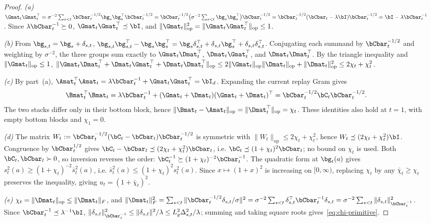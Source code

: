 \begin{proof}
\emph{(a)}
$\Gmat_t\Gmat_t^\top
=\sigma^{-2}\sum_{s<t}\bCbar_t^{-1/2}\bg_s\bg_s^\top\bCbar_t^{-1/2}
=\bCbar_t^{-1/2}\bigl(\sigma^{-2}\sum_{s<t}\bg_s\bg_s^\top\bigr)\bCbar_t^{-1/2}
=\bCbar_t^{-1/2}(\bCbar_t-\lambda\bI)\bCbar_t^{-1/2}
=\bI-\lambda\bCbar_t^{-1}$.
Since $\lambda\bCbar_t^{-1}\succeq0$, $\Gmat_t\Gmat_t^\top\preceq\bI$, and
$\|\Gmat_t\|_{\mathrm{op}}^2=\|\Gmat_t\Gmat_t^\top\|_{\mathrm{op}}\le1$.

\emph{(b)}
From $\bg_{s,t}=\bg_s+\delta_{s,t}$,
$\bg_{s,t}\bg_{s,t}^\top-\bg_s\bg_s^\top
=\bg_s\delta_{s,t}^\top+\delta_{s,t}\bg_s^\top+\delta_{s,t}\delta_{s,t}^\top$.
Conjugating each summand by $\bCbar_t^{-1/2}$ and weighting by
$\sigma^{-2}$, the three groups sum exactly to
$\Gmat_t\Dmat_t^\top$, $\Dmat_t\Gmat_t^\top$, and $\Dmat_t\Dmat_t^\top$.
By the triangle inequality and $\|\Gmat_t\|_{\mathrm{op}}\le1$,
$\|\Gmat_t\Dmat_t^\top+\Dmat_t\Gmat_t^\top+\Dmat_t\Dmat_t^\top\|_{\mathrm{op}}
\le 2\|\Gmat_t\|_{\mathrm{op}}\|\Dmat_t\|_{\mathrm{op}}+\|\Dmat_t\|_{\mathrm{op}}^2
\le 2\chi_t+\chi_t^2$.

\emph{(c)}
By part~(a),
$\Amat_t^\top\Amat_t=\lambda\bCbar_t^{-1}
+\Gmat_t\Gmat_t^\top=\bI_d$.  Expanding the current replay Gram gives
\[
 \Bmat_t^\top\Bmat_t
 =\lambda\bCbar_t^{-1}+(\Gmat_t+\Dmat_t)(\Gmat_t+\Dmat_t)^\top
 =\bCbar_t^{-1/2}\bC_t\bCbar_t^{-1/2}.
\]
The two stacks differ only in their bottom block, hence
$\|\Bmat_t-\Amat_t\|_{\rm op}=\|\Dmat_t^\top\|_{\rm op}=\chi_t$.
These identities also hold at $t=1$, with empty bottom blocks and $\chi_1=0$.

\emph{(d)}
The matrix $W_t:=\bCbar_t^{-1/2}(\bC_t-\bCbar_t)\bCbar_t^{-1/2}$ is
symmetric with $\|W_t\|_{\mathrm{op}}\le2\chi_t+\chi_t^2$, hence
$W_t\preceq(2\chi_t+\chi_t^2)\bI$.  Congruence by $\bCbar_t^{1/2}$ gives
$\bC_t-\bCbar_t\preceq(2\chi_t+\chi_t^2)\bCbar_t$, i.e.
$\bC_t\preceq(1+\chi_t)^2\bCbar_t$; no bound on $\chi_t$ is used.
Both $\bC_t,\bCbar_t\succ0$, so inversion reverses the order:
$\bC_t^{-1}\succeq(1+\chi_t)^{-2}\bCbar_t^{-1}$.  The quadratic form at
$\bg_t(a)$ gives $s_t^2(a)\ge(1+\chi_t)^{-2}\bar s_t^2(a)$, i.e.
$\bar s_t^2(a)\le(1+\chi_t)^2 s_t^2(a)$.  Since $x\mapsto(1+x)^2$ is
increasing on $[0,\infty)$, replacing $\chi_t$ by any $\bar\chi_t\ge\chi_t$
preserves the inequality, giving $u_t=(1+\bar\chi_t)^2$.

\emph{(e)}
$\chi_t=\|\Dmat_t\|_{\mathrm{op}}\le\|\Dmat_t\|_F$, and
$\|\Dmat_t\|_F^2=\sum_{s<t}\|\bCbar_t^{-1/2}\delta_{s,t}/\sigma\|^2
=\sigma^{-2}\sum_{s<t}\delta_{s,t}^\top\bCbar_t^{-1}\delta_{s,t}
=\sigma^{-2}\sum_{s<t}\|\delta_{s,t}\|_{\bCbar_t^{-1}}^2$.
Since $\bCbar_t^{-1}\preceq\lambda^{-1}\bI$,
$\|\delta_{s,t}\|_{\bCbar_t^{-1}}^2\le\|\delta_{s,t}\|^2/\lambda
\le L_g^2\Delta_{s,t}^2/\lambda$; summing and taking square roots
gives~\eqref{eq:chi-primitive}.
\end{proof}

